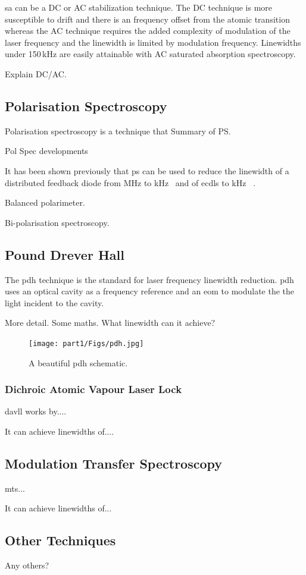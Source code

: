 \Gls{sa} can be a DC or AC stabilization technique.
The DC technique is more susceptible to drift and there is an frequency offset from the atomic transition whereas the AC technique requires the added complexity of modulation of the laser frequency and the linewidth is limited by modulation frequency.
Linewidths under 150\,kHz are easily attainable with AC saturated absorption spectroscopy.

{\color{red}Explain DC/AC.}

\subsection{Polarisation Spectroscopy}

Polarisation spectroscopy is a technique that Summary of PS.

Pol Spec developments

It has been shown previously that \gls*{ps} can be used to reduce the linewidth of a distributed feedback diode from \unit[2]{MHz} to \unit[20]{kHz}~\cite{torii_laser-phase_2012} and of \glspl*{ecdl} to \unit[65]{kHz}
~\cite{yoshikawa_frequency_2003}.

Balanced polarimeter.\cite{pearman_polarization_2002,yoshikawa_frequency_2003}

Bi-polarisation spectroscopy.\cite{tiwari_laser_2006}


\subsection{Pound Drever Hall}

The \gls{pdh} technique is the standard for laser frequency linewidth reduction.\cite{drever_laser_1983}
\gls{pdh} uses an optical cavity as a frequency reference and an \gls{eom} to modulate the the light incident to the cavity.

More detail. Some maths. What linewidth can it achieve?\cite{ludlow_compact_2007}

\begin{figure}
\centering
\texttt{[image: part1/Figs/pdh.jpg]}
\caption{A beautiful \gls{pdh} schematic.}
\end{figure}
\subsubsection{Dichroic Atomic Vapour Laser Lock}
\Gls{davll} works by....

It can achieve linewidths of....

\subsection{Modulation Transfer Spectroscopy}
\Gls{mts}...

It can achieve linewidths of...\cite{negnevitsky_wideband_2013}

\subsection{Other Techniques}

Any others?


